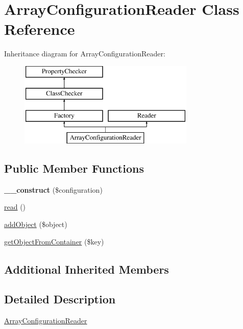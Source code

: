 \hypertarget{class_array_configuration_reader}{\section{Array\-Configuration\-Reader Class Reference}
\label{class_array_configuration_reader}
}
Inheritance diagram for Array\-Configuration\-Reader\-:\begin{figure}[H]
\begin{center}
\leavevmode
\includegraphics[height=4.000000cm]{class_array_configuration_reader}
\end{center}
\end{figure}
\subsection*{Public Member Functions}
\begin{DoxyCompactItemize}
\item 
\hypertarget{class_array_configuration_reader_ac3b02fe122d62521e13cbdd37795d72a}{{\bfseries \-\_\-\-\_\-construct} (\$configuration)}\label{class_array_configuration_reader_ac3b02fe122d62521e13cbdd37795d72a}

\item 
\hyperlink{class_array_configuration_reader_a64571309bfb3238c65fd3c2898f92440}{read} ()
\item 
\hyperlink{class_array_configuration_reader_ab10a1fa095c486bea43aadd057baaf78}{add\-Object} (\$object)
\item 
\hyperlink{class_array_configuration_reader_af6fa42b05b84795a316a1ebf2a154d6d}{get\-Object\-From\-Container} (\$key)
\end{DoxyCompactItemize}
\subsection*{Additional Inherited Members}


\subsection{Detailed Description}
\hyperlink{class_array_configuration_reader}{Array\-Configuration\-Reader}

